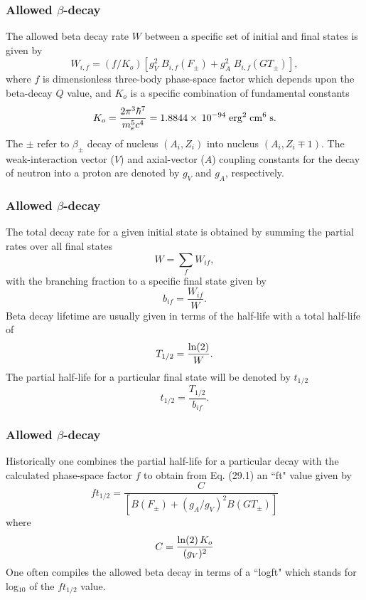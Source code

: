 \documentclass[compress]{beamer}
\begin{document}
\frame
{
\frametitle{Allowed $\beta$-decay}
\begin{small}
{\scriptsize
The allowed beta decay rate $  W  $ between a specific set of
initial and final states is given by
\[
W_{i,f} = (f/K_{o}) \left[ g_{V}^{2} \; B_{i,f}(F_{\pm})
+ g_{A}^{2} \; B_{i,f}(GT_{\pm})
\right], 
\]
where $  f  $ is dimensionless three-body
phase-space factor which depends upon the
beta-decay $  Q  $ value,
and $  K_{o}  $ is a specific combination of fundamental
constants
\[
           K_{o} = \frac{2 \pi ^{3}  \hbar ^{7} }{ m_{e}^{5} c^{4}}
 = 1.8844 \times\,  10^{-94} \; {\rm erg}^{2} \; {\rm cm}^{6} \;{\rm s} . 
\]
The $  \pm  $ refer to $\beta_{\pm}$ decay of nucleus
$  (A_{i},Z_{i})  $ into nucleus $  (A_{i},Z_{i} \mp 1)  $.
The weak-interaction vector ($  V  $) and axial-vector ($  A  $) coupling
constants for the decay of neutron into a proton are denoted by $  g_{V}  $
and $  g_{A}  $, respectively.
}
\end{small}
}
\frame
{
\frametitle{Allowed $\beta$-decay}
\begin{small}
{\scriptsize
The total decay rate for a given
initial state is obtained by summing the partial rates over all
final states
\[
W = \displaystyle\sum _{f} W_{if}, 
\]
with the branching fraction to a specific final state given by
\[
b_{if} = \frac{W_{if}}{W}.  
\]
Beta decay lifetime are usually given in terms of the half-life with
a total half-life of
\[
T_{1/2} = \frac{{\rm ln}(2)}{W}.
\]
The partial half-life for a particular final state will be
denoted by $  t_{1/2}  $
\[
t_{1/2} = \frac{T_{1/2}}{b_{if}}. 
\]
}
\end{small}
}
\frame
{
\frametitle{Allowed $\beta$-decay}
\begin{small}
{\scriptsize
Historically
one combines the partial half-life for a particular decay
with the calculated
phase-space factor $  f  $ to obtain from Eq. (29.1) an
``ft" value given by
\[
     f t_{1/2} = \frac{C }{ \left[ B(F_{\pm}) +
(g_{A}/g_{V})^{2} B(GT_{\pm}) \right] }  
\]
where
\[
        C = \frac{{\rm ln}(2) \,K_{o} }{ (g_{V})^{2}} 
\]
One often compiles the allowed beta decay in terms of a ``logft"
which stands for log$_{10}$ of the $  ft_{1/2}  $ value.
}
\end{small}
}
\end{document}
